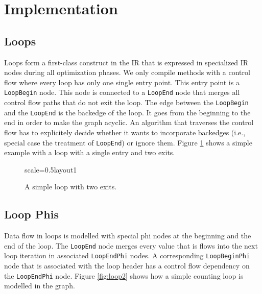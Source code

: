 \documentclass[twocolumn]{svjour3}
\newcommand\nodename[1]{\texttt{#1}}
\begin{document}
\section{Implementation}

\subsection{Loops}
Loops form a first-class construct in the IR that is expressed in specialized IR nodes during all optimization phases.
We only compile methods with a control flow where every loop has only one single entry point.
This entry point is a \nodename{LoopBegin} node.
This node is connected to a \nodename{LoopEnd} node that merges all control flow paths that do not exit the loop.
The edge between the \nodename{LoopBegin} and the \nodename{LoopEnd} is the backedge of the loop.
It goes from the beginning to the end in order to make the graph acyclic.
An algorithm that traverses the control flow has to explicitely decide whether it wants to incorporate backedges (i.e., special case the treatment of \nodename{LoopEnd}) or ignore them.
Figure \ref{fig:loop1} shows a simple example with a loop with a single entry and two exits.

\begin{figure}[h]
  \label{fig:loop1}
  \centering
\begin{digraphenv}{scale=0.5}{layout1}
\end{digraphenv}
  \caption{A simple loop with two exits.}
\end{figure}

\subsection{Loop Phis}
Data flow in loops is modelled with special phi nodes at the beginning and the end of the loop.
The \nodename{LoopEnd} node merges every value that is flows into the next loop iteration in associated \nodename{LoopEndPhi} nodes.
A corresponding \nodename{LoopBeginPhi} node that is associated with the loop header has a control flow dependency on the \nodename{LoopEndPhi} node.
Figure \ref{fig:loop2} shows how a simple counting loop is modelled in the graph.
\end{document}
